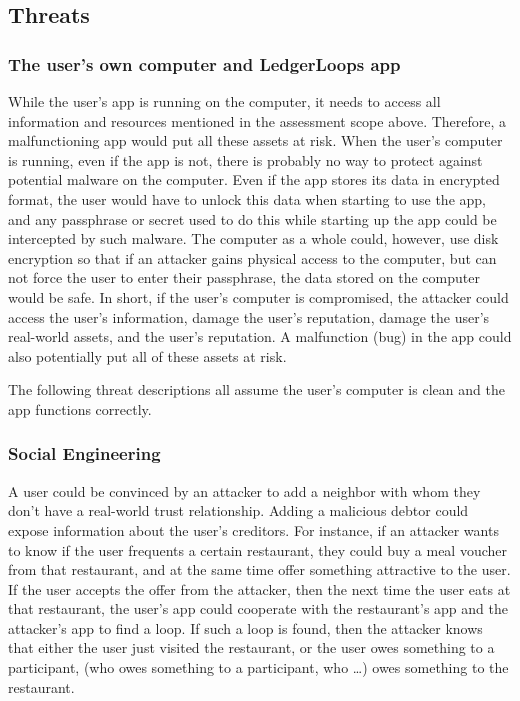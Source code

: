 \documentclass[11pt,twoside,a4paper]{article}
\begin{document}
\subsection{Threats}
\subsubsection{The user's own computer and LedgerLoops app}
While the user's app is running on the computer, it needs to access all information and resources mentioned in the assessment scope above. Therefore, a malfunctioning app would put all these assets at risk. When the user's computer is running, even if the app is not, there is probably no way to protect against potential malware on the computer. Even if the app stores its data in encrypted format, the user would have to unlock this data when starting to use the app, and any passphrase or secret used to do this while starting up the app could be intercepted by such malware. The computer as a whole could, however, use disk encryption so that if an attacker gains physical access to the computer, but can not force the user to enter their passphrase, the data stored on the computer would be safe. In short, if the user's computer is compromised, the attacker could access the user's information, damage the user's reputation, damage the user's real-world assets, and the user's reputation. A malfunction (bug) in the app could also potentially put all of these assets at risk.

The following threat descriptions all assume the user's computer is clean and the app functions correctly.

\subsubsection{Social Engineering}
A user could be convinced by an attacker to add a neighbor with whom they don't have a real-world trust relationship. Adding a ma\-li\-cious deb\-tor could expose information about the user's creditors. For instance, if an attacker wants to know if the user frequents a certain restaurant, they could buy a meal voucher from that restaurant, and at the same time offer something attractive to the user. If the user accepts the offer from the attacker, then the next time the user eats at that restaurant, the user's app could cooperate with the restaurant's app and the attacker's app to find a loop. If such a loop is found, then the attacker knows that either the user just visited the restaurant, or the user owes something to a participant, (who owes something to a participant, who \ldots) owes something to the restaurant.
\end{document}
